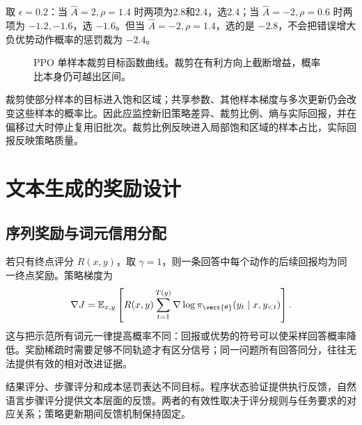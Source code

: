 \documentclass[../textbook.tex]{subfiles}
\begin{document}
取 $\epsilon=0.2$：当 $\widehat A=2,\rho=1.4$ 时两项为2.8和2.4，选2.4；当 $\widehat A=-2,\rho=0.6$ 时两项为 $-1.2,-1.6$，选 $-1.6$。但当 $\widehat A=-2,\rho=1.4$，选的是 $-2.8$，不会把错误增大负优势动作概率的惩罚裁为 $-2.4$。

\begin{figure}[htbp]
\centering
{}
\caption[PPO 单样本裁剪目标函数曲线]{PPO 单样本裁剪目标函数曲线。裁剪在有利方向上截断增益，概率比本身仍可越出区间。}\label{fig:rl-clip}
\end{figure}

裁剪使部分样本的目标进入饱和区域；共享参数、其他样本梯度与多次更新仍会改变这些样本的概率比。因此应监控新旧策略差异、裁剪比例、熵与实际回报，并在偏移过大时停止复用旧批次。裁剪比例反映进入局部饱和区域的样本占比，实际回报反映策略质量。

\section{文本生成的奖励设计}

\subsection{序列奖励与词元信用分配}
若只有终点评分 $R(x,y)$，取 $\gamma=1$，则一条回答中每个动作的后续回报均为同一终点奖励。策略梯度为
\begin{equation}
 \nabla J=\mathbb E_{x,y}\left[R(x,y)\sum_{t=1}^{T(y)}\nabla\log\pi_{\vect{\theta}}(y_t\mid x,y_{<t})\right].
 \label{eq:rl-lm-gradient}
\end{equation}
这与把示范所有词元一律提高概率不同：回报或优势的符号可以使采样回答概率降低。奖励稀疏时需要足够不同轨迹才有区分信号；同一问题所有回答同分，往往无法提供有效的相对改进证据。

结果评分、步骤评分和成本惩罚表达不同目标。程序状态验证提供执行反馈，自然语言步骤评分提供文本层面的反馈。两者的有效性取决于评分规则与任务要求的对应关系；策略更新期间反馈机制保持固定。
\end{document}
